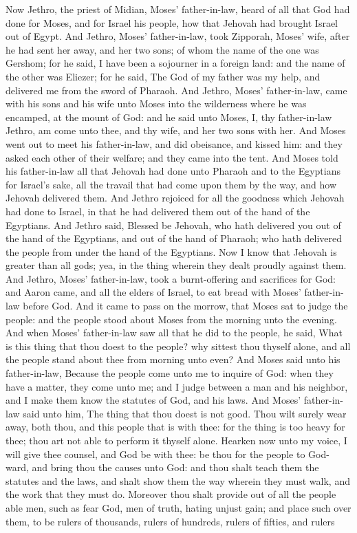 Now Jethro, the priest of Midian, Moses’ father-in-law, heard of all that God had done for Moses, and for Israel his people, how that Jehovah had brought Israel out of Egypt. And Jethro, Moses’ father-in-law, took Zipporah, Moses’ wife, after he had sent her away, and her two sons; of whom the name of the one was Gershom; for he said, I have been a sojourner in a foreign land: and the name of the other was Eliezer; for he said, The God of my father was my help, and delivered me from the sword of Pharaoh. And Jethro, Moses’ father-in-law, came with his sons and his wife unto Moses into the wilderness where he was encamped, at the mount of God: and he said unto Moses, I, thy father-in-law Jethro, am come unto thee, and thy wife, and her two sons with her. And Moses went out to meet his father-in-law, and did obeisance, and kissed him: and they asked each other of their welfare; and they came into the tent. And Moses told his father-in-law all that Jehovah had done unto Pharaoh and to the Egyptians for Israel’s sake, all the travail that had come upon them by the way, and how Jehovah delivered them. And Jethro rejoiced for all the goodness which Jehovah had done to Israel, in that he had delivered them out of the hand of the Egyptians. And Jethro said, Blessed be Jehovah, who hath delivered you out of the hand of the Egyptians, and out of the hand of Pharaoh; who hath delivered the people from under the hand of the Egyptians. Now I know that Jehovah is greater than all gods; yea, in the thing wherein they dealt proudly against them. And Jethro, Moses’ father-in-law, took a burnt-offering and sacrifices for God: and Aaron came, and all the elders of Israel, to eat bread with Moses’ father-in-law before God.  And it came to pass on the morrow, that Moses sat to judge the people: and the people stood about Moses from the morning unto the evening. And when Moses’ father-in-law saw all that he did to the people, he said, What is this thing that thou doest to the people? why sittest thou thyself alone, and all the people stand about thee from morning unto even? And Moses said unto his father-in-law, Because the people come unto me to inquire of God: when they have a matter, they come unto me; and I judge between a man and his neighbor, and I make them know the statutes of God, and his laws. And Moses’ father-in-law said unto him, The thing that thou doest is not good. Thou wilt surely wear away, both thou, and this people that is with thee: for the thing is too heavy for thee; thou art not able to perform it thyself alone. Hearken now unto my voice, I will give thee counsel, and God be with thee: be thou for the people to God-ward, and bring thou the causes unto God: and thou shalt teach them the statutes and the laws, and shalt show them the way wherein they must walk, and the work that they must do. Moreover thou shalt provide out of all the people able men, such as fear God, men of truth, hating unjust gain; and place such over them, to be rulers of thousands, rulers of hundreds, rulers of fifties, and rulers 